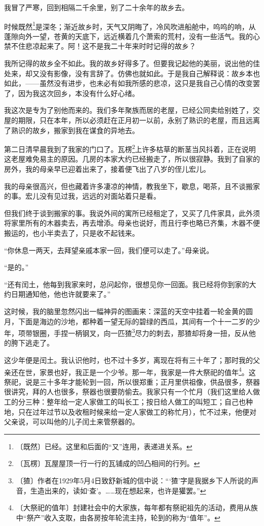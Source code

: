 \documentclass[12pt,UTF-8,openany]{ctexbook}
\begin{document}
\begin{large}
    
    我冒了严寒，回到相隔二千余里，别了二十余年的故乡去。
    
    时候既然\footnote{〔既然〕已经。这里和后面的“又”连用，表递进关系。}是深冬；渐近故乡时，天气又阴晦了，冷风吹进船舱中，呜呜的响，从蓬隙向外一望，苍黄的天底下，远近横着几个萧索的荒村，没有一些活气。我的心禁不住悲凉起来了。阿！这不是我二十年来时时记得的故乡？
    
    我所记得的故乡全不如此。我的故乡好得多了。但要我记起他的美丽，说出他的佳处来，却又没有影像，没有言辞了。仿佛也就如此。于是我自己解释说：故乡本也如此，——虽然没有进步，也未必有如我所感的悲凉，这只是我自己心情的改变罢了，因为我这次回乡，本没有什么好心绪。
    
    我这次是专为了别他而来的。我们多年聚族而居的老屋，已经公同卖给别姓了，交屋的期限，只在本年，所以必须赶在正月初一以前，永别了熟识的老屋，而且远离了熟识的故乡，搬家到我在谋食的异地去。
    
    第二日清早晨我到了我家的门口了。瓦楞\footnote{〔瓦楞〕瓦屋屋顶一行一行的瓦铺成的凹凸相间的行列。}上许多枯草的断茎当风抖着，正在说明这老屋难免易主的原因。几房的本家大约已经搬走了，所以很寂静。我到了自家的房外，我的母亲早已迎着出来了，接着便飞出了八岁的侄儿宏儿。
    
    我的母亲很高兴，但也藏着许多凄凉的神情，教我坐下，歇息，喝茶，且不谈搬家的事。宏儿没有见过我，远远的对面站着只是看。
    
    但我们终于谈到搬家的事。我说外间的寓所已经租定了，又买了几件家具，此外须将家里所有的木器卖去，再去增添。母亲也说好，而且行李也略已齐集，木器不便搬运的，也小半卖去了，只是收不起钱来。
    
    “你休息一两天，去拜望亲戚本家一回，我们便可以走了。”母亲说。
    
    “是的。”
    
    “还有闰土，他每到我家来时，总问起你，很想见你一回面。我已经将你到家的大约日期通知他，他也许就要来了。”
    
    这时候，我的脑里忽然闪出一幅神异的图画来：深蓝的天空中挂着一轮金黄的圆月，下面是海边的沙地，都种着一望无际的碧绿的西瓜，其间有一个十一二岁的少年，项带银圈，手捏一柄钢叉，向一匹猹\footnote{〔猹〕作者在1929年5月4日致舒新城的信中说：“‘猹’字是我据乡下人所说的声音，生造出来的，读如‘查’。……现在想起来，也许是獾罢。”}尽力的刺去，那猹却将身一扭，反从他的胯下逃走了。
    
    这少年便是闰土。我认识他时，也不过十多岁，离现在将有三十年了；那时我的父亲还在世，家景也好，我正是一个少爷。那一年，我家是一件大祭祀的值年\footnote{〔大祭祀的值年〕封建社会中的大家族，每年都有祭祀祖先的活动，费用从族中“祭产”收入支取，由各房按年轮流主持，轮到的称为“值年”。}。这祭祀，说是三十多年才能轮到一回，所以很郑重；正月里供祖像，供品很多，祭器很讲究，拜的人也很多，祭器也很要防偷去。我家只有一个忙月（我们这里给人做工的分三种：整年给一定人家做工的叫长工；按日给人做工的叫短工；自己也种地，只在过年过节以及收租时候来给一定人家做工的称忙月），忙不过来，他便对父亲说，可以叫他的儿子闰土来管祭器的。
    

\end{large}
\end{document}
